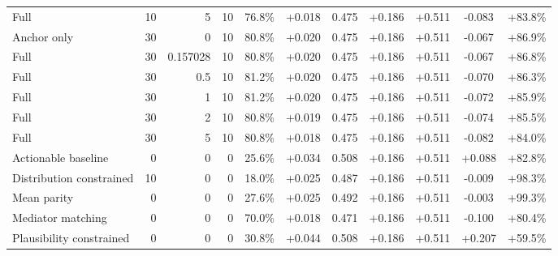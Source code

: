 \begin{table}[htbp]
\begin{tabular}{lrrrccccccc}
Full & 10 & 5 & 10 & 76.8\% & +0.018 & 0.475 & +0.186 & +0.511 & -0.083 & +83.8\% \\
Anchor only & 30 & 0 & 10 & 80.8\% & +0.020 & 0.475 & +0.186 & +0.511 & -0.067 & +86.9\% \\
Full & 30 & 0.157028 & 10 & 80.8\% & +0.020 & 0.475 & +0.186 & +0.511 & -0.067 & +86.8\% \\
Full & 30 & 0.5 & 10 & 81.2\% & +0.020 & 0.475 & +0.186 & +0.511 & -0.070 & +86.3\% \\
Full & 30 & 1 & 10 & 81.2\% & +0.020 & 0.475 & +0.186 & +0.511 & -0.072 & +85.9\% \\
Full & 30 & 2 & 10 & 80.8\% & +0.019 & 0.475 & +0.186 & +0.511 & -0.074 & +85.5\% \\
Full & 30 & 5 & 10 & 80.8\% & +0.018 & 0.475 & +0.186 & +0.511 & -0.082 & +84.0\% \\
Actionable baseline & 0 & 0 & 0 & 25.6\% & +0.034 & 0.508 & +0.186 & +0.511 & +0.088 & +82.8\% \\
Distribution constrained & 10 & 0 & 0 & 18.0\% & +0.025 & 0.487 & +0.186 & +0.511 & -0.009 & +98.3\% \\
Mean parity & 0 & 0 & 0 & 27.6\% & +0.025 & 0.492 & +0.186 & +0.511 & -0.003 & +99.3\% \\
Mediator matching & 0 & 0 & 0 & 70.0\% & +0.018 & 0.471 & +0.186 & +0.511 & -0.100 & +80.4\% \\
Plausibility constrained & 0 & 0 & 0 & 30.8\% & +0.044 & 0.508 & +0.186 & +0.511 & +0.207 & +59.5\% \\
\bottomrule
\end{tabular}
\end{table}